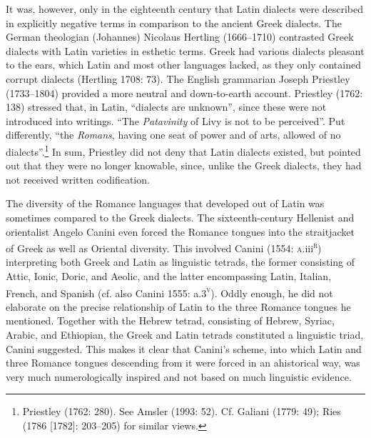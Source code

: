 \documentclass[12pt]{article}
\newenvironment{styleStandard}{\renewcommand\baselinestretch{1.25}\setlength\leftskip{0in}\setlength\rightskip{0in}\setlength\parindent{0.1972in}\setlength\parfillskip{0pt plus 1fil}\setlength\parskip{0in plus 1pt}\writerlistparindent\writerlistleftskip\leavevmode\normalfont\normalsize\writerlistlabel\ignorespaces}{\unskip\vspace{0in plus 1pt}\par}
\newcommand\writerlistleftskip{}
\newcommand\writerlistparindent{}
\newcommand\writerlistlabel{}
\begin{document}
\begin{styleStandard}
It was, however, only in the eighteenth century that Latin dialects were described in explicitly negative terms in comparison to the ancient Greek dialects. The German theologian (Johannes) Nicolaus Hertling (1666–1710) contrasted Greek dialects with Latin varieties in esthetic terms. Greek had various dialects pleasant to the ears, which Latin and most other languages lacked, as they only contained corrupt dialects (Hertling 1708: 73). The English grammarian Joseph Priestley (1733–1804) provided a more neutral and down-to-earth account. Priestley (1762: 138) stressed that, in Latin, “dialects are unknown”, since these were not introduced into writings. “The \textit{Patavinity} of Livy is not to be perceived”. Put differently, “the \textit{Romans}, having one seat of power and of arts, allowed of no dialects”.\footnote{ Priestley (1762: 280). See Amsler (1993: 52). Cf. Galiani (1779: 49); Ries (1786 [1782]: 203–205) for similar views.} In sum, Priestley did not deny that Latin dialects existed, but pointed out that they were no longer knowable, since, unlike the Greek dialects, they had not received written codification.
\end{styleStandard}

\begin{styleStandard}
The diversity of the Romance languages that developed out of Latin was sometimes compared to the Greek dialects. The sixteenth-century Hellenist and orientalist Angelo Canini even forced the Romance tongues into the straitjacket of Greek as well as Oriental diversity. This involved Canini (1554: \textsc{a}.iii\textsc{\textsuperscript{r}}) interpreting both Greek and Latin as linguistic tetrads, the former consisting of Attic, Ionic, Doric, and Aeolic, and the latter encompassing Latin, Italian, French, and Spanish (cf. also Canini 1555: a.3\textsc{\textsuperscript{v}}). Oddly enough, he did not elaborate on the precise relationship of Latin to the three Romance tongues he mentioned. Together with the Hebrew tetrad, consisting of Hebrew, Syriac, Arabic, and Ethiopian, the Greek and Latin tetrads constituted a linguistic triad, Canini suggested. This makes it clear that Canini’s scheme, into which Latin and three Romance tongues descending from it were forced in an ahistorical way, was very much numerologically inspired and not based on much linguistic evidence.
\end{styleStandard}
\end{document}
